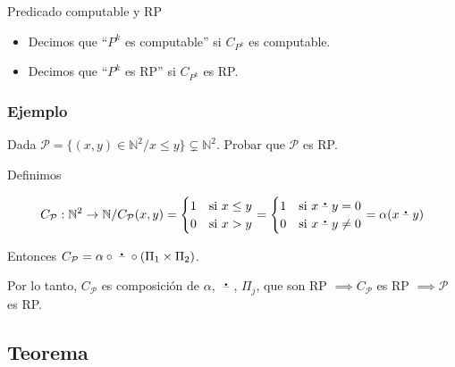 \medskip

\begin{definicion}{Predicado computable y RP}{}
    \begin{itemize}
        \item Decimos que ``$P^k$ es computable'' si 
            $C_{P^k}$ es computable.
        \item Decimos que ``$P^k$ es RP'' si 
            $C_{P^k}$ es RP.
    \end{itemize}

\end{definicion}

\subsubsection{Ejemplo}

Dada $\mathcal{P} = \{ (x,y) \in \mathbb{N}^2 / x \leq y \} \subsetneq \mathbb{N}^2$.
Probar que $\mathcal{P}$ es RP.

Definimos

\begin{gather*}
    C_{\mathcal{P}}: \mathbb{N}^2 \to \mathbb{N} / C_{\mathcal{P}} (x,y) =
    \begin{cases}
        1 & \text{si } x \leq y \\
        0 & \text{si } x > y
    \end{cases} =
    \begin{cases}
        1 & \text{si } x \;\accentset{\mbox{\large\bfseries .}}{\text{--}}\; y  = 0\\
        0 & \text{si } x \;\accentset{\mbox{\large\bfseries .}}{\text{--}}\; y \neq 0
    \end{cases} = \alpha(x \;\accentset{\mbox{\large\bfseries .}}{\text{--}}\; y)
\end{gather*}

%
Entonces $C_{\mathcal{P}} 
= \alpha \circ \;\accentset{\mbox{\large\bfseries .}}{\text{--}}\; \circ (\Pi_1 \times \Pi_2)$.

Por lo tanto, $C_{\mathcal{P}}$ es composición de $\alpha$, $\;\accentset{\mbox{\large\bfseries .}}{\text{--}}\;$,
$\Pi_j$, que son RP $\implies C_{\mathcal{P}}$ es RP $\implies \mathcal{P}$ es
RP.

\subsection{Teorema}

